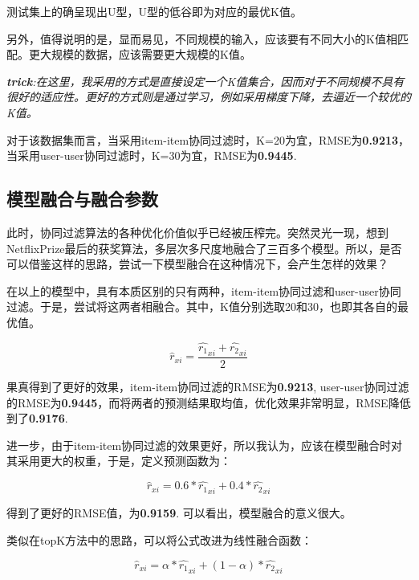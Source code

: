\documentclass[utf8, a4paper,12pt, onecolumn]{ctexart}
\begin{document}
\begin{spacing}{1.3}
测试集上的确呈现出U型，U型的低谷即为对应的最优K值。

另外，值得说明的是，显而易见，不同规模的输入，应该要有不同大小的K值相匹配。更大规模的数据，应该需要更大规模的K值。

\textit{\textbf{trick}:在这里，我采用的方式是直接设定一个K值集合，因而对于不同规模不具有很好的适应性。更好的方式则是通过学习，例如采用梯度下降，去逼近一个较优的K值。}

对于该数据集而言，当采用item-item协同过滤时，K=20为宜，RMSE为\textbf{0.9213}，当采用user-user协同过滤时，K=30为宜，RMSE为\textbf{0.9445}.

%
%
%

\subsection{模型融合与融合参数}

此时，协同过滤算法的各种优化价值似乎已经被压榨完。突然灵光一现，想到NetflixPrize最后的获奖算法，多层次多尺度地融合了三百多个模型。所以，是否可以借鉴这样的思路，尝试一下模型融合在这种情况下，会产生怎样的效果？

在以上的模型中，具有本质区别的只有两种，item-item协同过滤和user-user协同过滤。于是，尝试将这两者相融合。其中，K值分别选取20和30，也即其各自的最优值。

\[\hat{r}_{xi} = \frac{\hat{r_1}_{xi} + \hat{r_2}_{xi}}{2}\]

果真得到了更好的效果，item-item协同过滤的RMSE为\textbf{0.9213}, user-user协同过滤的RMSE为\textbf{0.9445}，而将两者的预测结果取均值，优化效果非常明显，RMSE降低到了\textbf{0.9176}.

进一步，由于item-item协同过滤的效果更好，所以我认为，应该在模型融合时对其采用更大的权重，于是，定义预测函数为：

\[\hat{r}_{xi} = 0.6 * \hat{r_1}_{xi} + 0.4 * \hat{r_2}_{xi}\]

得到了更好的RMSE值，为\textbf{0.9159}. 可以看出，模型融合的意义很大。

类似在topK方法中的思路，可以将公式改进为线性融合函数：

\[\hat{r}_{xi} = \alpha * \hat{r_1}_{xi} + (1-\alpha) * \hat{r_2}_{xi}\]


\end{spacing}
\end{document}
